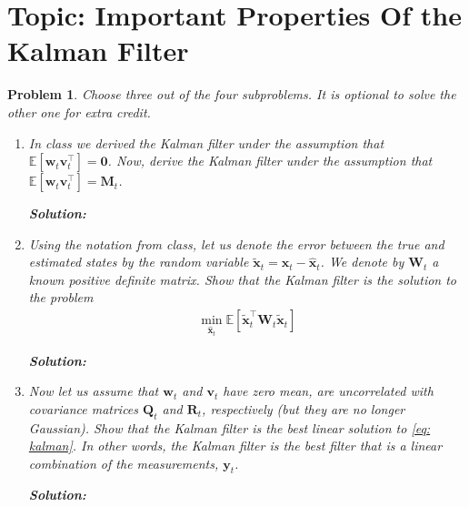 \documentclass[11pt]{article}
\theoremstyle{plain} %
\newtheorem{problem}[theorem]{Problem}
\newenvironment{solution}
{\color{C2}\normalfont\begin{framed}\begingroup\textbf{Solution:} }
  {\endgroup\end{framed}}
\theoremstyle{remark}
\begin{document}
\section{Topic: Important Properties Of the Kalman Filter}
\begin{problem}
Choose three out of the four subproblems. It is optional to solve the other one
for extra credit.
\begin{enumerate}[label=(\alph*)]
  \item In class we derived the Kalman filter under the assumption that
        $\mathbb{E}\left[\mathbf{w}_t \mathbf{v}_t^\top\right]=\mathbf{0}$. Now,
        derive the Kalman filter under the assumption that
        $\mathbb{E}\left[\mathbf{w}_t \mathbf{v}_t^\top\right]=\mathbf{M}_t$.

        \begin{solution}
          
        \end{solution}
  \item Using the notation from class, let us denote the error between the true
        and estimated states by the random variable
        $\widetilde{\mathbf{x}}_t=\mathbf{x}_t-\hat{\mathbf{x}}_t$. We denote by
        $\mathbf{W}_t$ a known positive definite matrix. Show that the Kalman filter
        is the solution to the problem
        \begin{align}
          \min _{\hat{\mathbf{x}}_t} \mathbb{E}\left[\widetilde{\mathbf{x}}_t^\top \mathbf{W}_t \widetilde{\mathbf{x}}_t\right]\label{eq: kalman}
        \end{align}

        \begin{solution}
          
        \end{solution}
  \item Now let us assume that $\mathbf{w}_t$ and $\mathbf{v}_t$ have zero mean,
        are uncorrelated with covariance matrices $\mathbf{Q}_t$ and $\mathbf{R}_t$,
        respectively (but they are no longer Gaussian). Show that the Kalman filter is
        the best linear solution to \cref{eq: kalman}. In other words, the Kalman
        filter is the best filter that is a linear combination of the measurements,
        $\mathbf{y}_t$.

        \begin{solution}
          

\end{solution}
\end{enumerate}
\end{problem}
\end{document}
